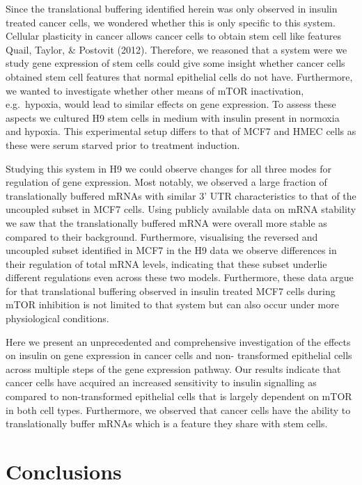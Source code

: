 \documentclass[
  12pt,
  openany]{book}
\begin{document}
Since the translational buffering identified herein was only observed in insulin treated cancer cells, we wondered whether this is only specific to this system. Cellular plasticity in cancer allows cancer cells to obtain stem cell like features Quail, Taylor, \& Postovit (2012). Therefore, we reasoned that a system were we study gene expression of stem cells could give some insight whether cancer cells obtained stem cell features that normal epithelial cells do not have. Furthermore, we wanted to investigate whether other means of mTOR inactivation, e.g.~hypoxia, would lead to similar effects on gene expression. To assess these aspects we cultured H9 stem cells in medium with insulin present in normoxia and hypoxia. This experimental setup differs to that of MCF7 and HMEC cells as these were serum starved prior to treatment induction.

Studying this system in H9 we could observe changes for all three modes for regulation of gene expression. Most notably, we observed a large fraction of translationally buffered mRNAs with similar 3' UTR characteristics to that of the uncoupled subset in MCF7 cells. Using publicly available data on mRNA stability we saw that the translationally buffered mRNA were overall more stable as compared to their background. Furthermore, visualising the reversed and uncoupled subset identified in MCF7 in the H9 data we observe differences in their regulation of total mRNA levels, indicating that these subset underlie different regulations even across these two models. Furthermore, these data argue for that translational buffering observed in insulin treated MCF7 cells during mTOR inhibition is not limited to that system but can also occur under more physiological conditions.

Here we present an unprecedented and comprehensive investigation of the effects on insulin on gene expression in cancer cells and non- transformed epithelial cells across multiple steps of the gene expression pathway. Our results indicate that cancer cells have acquired an increased sensitivity to insulin signalling as compared to non-transformed epithelial cells that is largely dependent on mTOR in both cell types. Furthermore, we observed that cancer cells have the ability to translationally buffer mRNAs which is a feature they share with stem cells.

\chapter{Conclusions}
\end{document}
